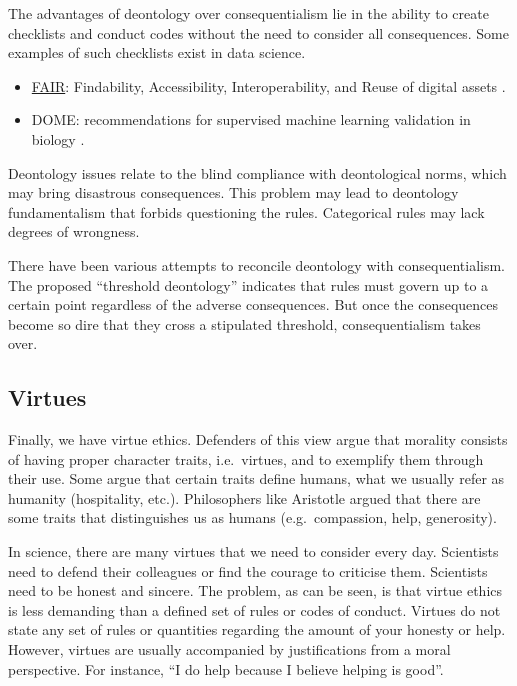 \documentclass[
]{book}
\providecommand{\tightlist}{%
  \setlength{\itemsep}{0pt}\setlength{\parskip}{0pt}}
\begin{document}
The advantages of deontology over consequentialism lie in the ability to create checklists and conduct codes without the need to consider all consequences. Some examples of such checklists exist in data science.

\begin{itemize}
\tightlist
\item
  \href{https://www.go-fair.org/}{FAIR}: Findability, Accessibility, Interoperability, and Reuse of digital assets \citep{wilkinson2016fair}.
\item
  DOME: recommendations for supervised machine learning validation in biology \citep{walsh2021dome}.
\end{itemize}

Deontology issues relate to the blind compliance with deontological norms, which may bring disastrous consequences. This problem may lead to deontology fundamentalism that forbids questioning the rules. Categorical rules may lack degrees of wrongness.

There have been various attempts to reconcile deontology with consequentialism. The proposed ``threshold deontology'' indicates that rules must govern up to a certain point regardless of the adverse consequences. But once the consequences become so dire that they cross a stipulated threshold, consequentialism takes over.

\hypertarget{virtues}{%
\subsection{Virtues}\label{virtues}}

Finally, we have virtue ethics. Defenders of this view argue that morality consists of having proper character traits, i.e.~virtues, and to exemplify them through their use. Some argue that certain traits define humans, what we usually refer as humanity (hospitality, etc.). Philosophers like Aristotle argued that there are some traits that distinguishes us as humans (e.g.~compassion, help, generosity).

In science, there are many virtues that we need to consider every day. Scientists need to defend their colleagues or find the courage to criticise them. Scientists need to be honest and sincere. The problem, as can be seen, is that virtue ethics is less demanding than a defined set of rules or codes of conduct. Virtues do not state any set of rules or quantities regarding the amount of your honesty or help. However, virtues are usually accompanied by justifications from a moral perspective. For instance, ``I do help because I believe helping is good''.
\end{document}
